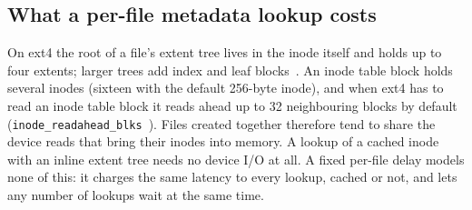 \subsection{What a per-file metadata lookup costs}
On ext4 the root of a file's extent tree lives in the inode itself and holds up to
four extents; larger trees add index and leaf blocks~\cite{kernelext4}. An inode
table block holds several inodes (sixteen with the default 256-byte inode), and when
ext4 has to read an inode table block it reads ahead up to 32 neighbouring blocks by
default (\texttt{inode\_readahead\_blks}~\cite{kernelext4admin}). Files created together therefore tend to
share the device reads that bring their inodes into memory. A lookup of a cached
inode with an inline extent tree needs no device I/O at all. A fixed per-file delay
models none of this: it charges the same latency to every lookup, cached or not,
and lets any number of lookups wait at the same time.
